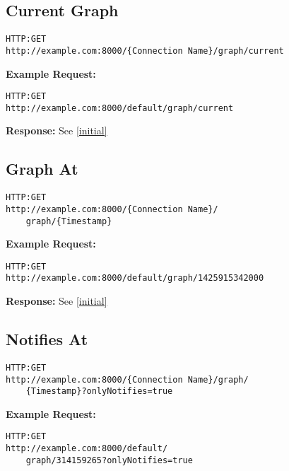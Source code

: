 \subsection{Current Graph}
\begin{lstlisting}
HTTP:GET
http://example.com:8000/{Connection Name}/graph/current
\end{lstlisting}

\begin{minipage}{\linewidth}
\textbf{Example Request:}
\begin{lstlisting}
HTTP:GET
http://example.com:8000/default/graph/current
\end{lstlisting}
\end{minipage}

\begin{minipage}{\linewidth}
\textbf{Response:}
See \ref{initial}
\end{minipage}

\subsection{Graph At}
\begin{lstlisting}
HTTP:GET
http://example.com:8000/{Connection Name}/
	graph/{Timestamp}
\end{lstlisting}

\begin{minipage}{\linewidth}
\textbf{Example Request:}
\begin{lstlisting}
HTTP:GET
http://example.com:8000/default/graph/1425915342000
\end{lstlisting}
\end{minipage}

\begin{minipage}{\linewidth}
\textbf{Response:}
See \ref{initial}
\end{minipage}

\subsection{Notifies At}
\begin{lstlisting}
HTTP:GET
http://example.com:8000/{Connection Name}/graph/
	{Timestamp}?onlyNotifies=true
\end{lstlisting}

\begin{minipage}{\linewidth}
\textbf{Example Request:}
\begin{lstlisting}
HTTP:GET
http://example.com:8000/default/
	graph/314159265?onlyNotifies=true
\end{lstlisting}
\end{minipage}

